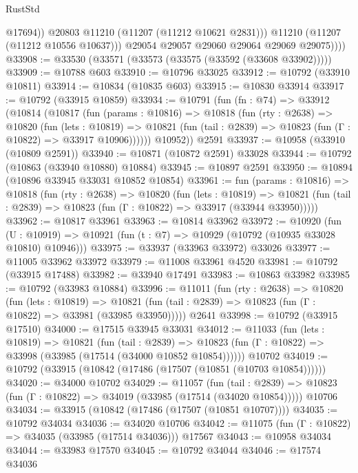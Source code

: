 \begin{lexlean}{RustStd}
\begin{coremodule}
                    @17694))
                @20803
                @11210
                (@11207 (@11212 @10621 @2831)))
              @11210
              (@11207 (@11212 @10556 @10637)))
            @29054
            @29057
            @29060
            @29064
            @29069
            @29075))))
@33908 := @33530 (@33571 (@33573 (@33575 (@33592 (@33608 @33902)))))
@33909 := @10788 @603
@33910 := @10796 @33025
@33912 := @10792 (@33910 @10811)
@33914 := @10834 (@10835 @603)
@33915 := @10830 @33914
@33917 := @10792 (@33915 @10859)
@33934 := @10791
    (fun (fn : @74) =>
    @33912
      (@10814
        (@10817
          (fun (params : @10816) =>
          @10818
            (fun (rty : @2638) =>
            @10820
              (fun (lets : @10819) =>
              @10821 (fun (tail : @2839) => @10823 (fun (Γ : @10822) => @33917 @10906))))))
        @10952))
    @2591
@33937 := @10958 (@33910 (@10809 @2591))
@33940 := @10871 (@10872 @2591) @33028
@33944 := @10792 (@10863 (@33940 @10880) @10884)
@33945 := @10897 @2591
@33950 := @10894 (@10896 @33945 @33031 @10852 @10854)
@33961 := fun (params : @10816) =>
  @10818
    (fun (rty : @2638) =>
    @10820
      (fun (lets : @10819) =>
      @10821 (fun (tail : @2839) => @10823 (fun (Γ : @10822) => @33917 (@33944 @33950)))))
@33962 := @10817 @33961
@33963 := @10814 @33962
@33972 := @10920
    (fun (U : @10919) => @10921 (fun (t : @7) => @10929 (@10792 (@10935 @33028 @10810) @10946)))
@33975 := @33937 (@33963 @33972) @33026
@33977 := @11005 @33962 @33972
@33979 := @11008 @33961 @4520
@33981 := @10792 (@33915 @17488)
@33982 := @33940 @17491
@33983 := @10863 @33982
@33985 := @10792 (@33983 @10884)
@33996 := @11011
    (fun (rty : @2638) =>
    @10820
      (fun (lets : @10819) =>
      @10821 (fun (tail : @2839) => @10823 (fun (Γ : @10822) => @33981 (@33985 @33950)))))
    @2641
@33998 := @10792 (@33915 @17510)
@34000 := @17515 @33945 @33031
@34012 := @11033
    (fun (lets : @10819) =>
    @10821
      (fun (tail : @2839) =>
      @10823 (fun (Γ : @10822) => @33998 (@33985 (@17514 (@34000 @10852 @10854))))))
    @10702
@34019 := @10792 (@33915 (@10842 (@17486 (@17507 (@10851 (@10703 @10854))))))
@34020 := @34000 @10702
@34029 := @11057
    (fun (tail : @2839) => @10823 (fun (Γ : @10822) => @34019 (@33985 (@17514 (@34020 @10854)))))
    @10706
@34034 := @33915 (@10842 (@17486 (@17507 (@10851 @10707))))
@34035 := @10792 @34034
@34036 := @34020 @10706
@34042 := @11075 (fun (Γ : @10822) => @34035 (@33985 (@17514 @34036))) @17567
@34043 := @10958 @34034
@34044 := @33983 @17570
@34045 := @10792 @34044
@34046 := @17574 @34036

\end{coremodule}
\end{lexlean}
